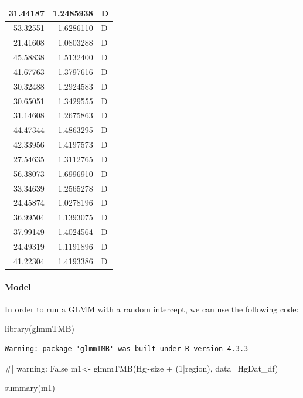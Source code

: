 \documentclass[
  letterpaper,
  DIV=11,
  numbers=noendperiod]{scrartcl}
\let\oldparagraph\paragraph
\renewcommand{\paragraph}[1]{\oldparagraph{#1}\mbox{}}
\newenvironment{Shaded}{\begin{snugshade}}{\end{snugshade}}
\newcommand{\AttributeTok}[1]{\textcolor[rgb]{0.40,0.45,0.13}{#1}}
\newcommand{\CommentTok}[1]{\textcolor[rgb]{0.37,0.37,0.37}{#1}}
\newcommand{\DecValTok}[1]{\textcolor[rgb]{0.68,0.00,0.00}{#1}}
\newcommand{\FunctionTok}[1]{\textcolor[rgb]{0.28,0.35,0.67}{#1}}
\newcommand{\NormalTok}[1]{\textcolor[rgb]{0.00,0.23,0.31}{#1}}
\newcommand{\OtherTok}[1]{\textcolor[rgb]{0.00,0.23,0.31}{#1}}
\newcommand{\SpecialCharTok}[1]{\textcolor[rgb]{0.37,0.37,0.37}{#1}}
\begin{document}
\begin{table}
\begin{tabular}[t]{r|r|l}
\hline
31.44187 & 1.2485938 & D\\
\hline
53.32551 & 1.6286110 & D\\
\hline
21.41608 & 1.0803288 & D\\
\hline
45.58838 & 1.5132400 & D\\
\hline
41.67763 & 1.3797616 & D\\
\hline
30.32488 & 1.2924583 & D\\
\hline
30.65051 & 1.3429555 & D\\
\hline
31.14608 & 1.2675863 & D\\
\hline
44.47344 & 1.4863295 & D\\
\hline
42.33956 & 1.4197573 & D\\
\hline
27.54635 & 1.3112765 & D\\
\hline
56.38073 & 1.6996910 & D\\
\hline
33.34639 & 1.2565278 & D\\
\hline
24.45874 & 1.0278196 & D\\
\hline
36.99504 & 1.1393075 & D\\
\hline
37.99149 & 1.4024564 & D\\
\hline
24.49319 & 1.1191896 & D\\
\hline
41.22304 & 1.4193386 & D\\
\hline
\end{tabular}
\end{table}

\paragraph{Model}\label{model}

In order to run a GLMM with a random intercept, we can use the following
code:

\begin{Shaded}
\begin{Highlighting}[]
\FunctionTok{library}\NormalTok{(glmmTMB)}
\end{Highlighting}
\end{Shaded}

\begin{verbatim}
Warning: package 'glmmTMB' was built under R version 4.3.3
\end{verbatim}

\begin{Shaded}
\begin{Highlighting}[]
\CommentTok{\#| warning: False }
\NormalTok{m1}\OtherTok{\textless{}{-}} \FunctionTok{glmmTMB}\NormalTok{(Hg}\SpecialCharTok{\textasciitilde{}}\NormalTok{size }\SpecialCharTok{+}\NormalTok{ (}\DecValTok{1}\SpecialCharTok{|}\NormalTok{region), }\AttributeTok{data=}\NormalTok{HgDat\_df)}

\FunctionTok{summary}\NormalTok{(m1)}
\end{Highlighting}
\end{Shaded}
\end{document}
